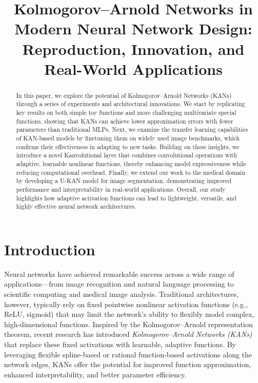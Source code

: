 \documentclass[conference]{IEEEtran}
\title{\Huge Kolmogorov–Arnold Networks in Modern Neural Network Design: Reproduction, Innovation, and Real-World Applications}
\author{
    \IEEEauthorblockN{
        Dimitrios Georgoulopoulos, \textbf{03120862},\,
        Ioannis Karaparisis, \textbf{09321011},\,
        Ioakeim El-Hattab Bistrogiannis, \textbf{03400249},\\
        Panagiotis-Alexios Spanakis, \textbf{03400274},\,
        Grigorios Trakas, \textbf{03119855}
    }
}
\begin{document}
\maketitle

\begin{abstract}
    In this paper, we explore the potential of Kolmogorov–Arnold Networks (KANs)
    through a series of experiments and architectural innovations. We start by
    replicating key results on both simple toy functions and more challenging
    multivariate special functions, showing that KANs can achieve lower
    approximation errors with fewer parameters than traditional MLPs. Next, we
    examine the transfer learning capabilities of KAN-based models by finetuning
    them on widely used image benchmarks, which confirms their effectiveness in
    adapting to new tasks. Building on these insights, we introduce a novel
    Kanvolutional layer that combines convolutional operations with adaptive,
    learnable nonlinear functions, thereby enhancing model expressiveness while
    reducing computational overhead. Finally, we extend our work to the medical
    domain by developing a U-KAN model for image segmentation, demonstrating
    improved performance and interpretability in real-world applications. Overall,
    our study highlights how adaptive activation functions can lead to lightweight,
    versatile, and highly effective neural network architectures.
\end{abstract}

\section{Introduction}

Neural networks have achieved remarkable success across a wide range of
applications—from image recognition and natural language processing to
scientific computing and medical image analysis. Traditional architectures,
however, typically rely on fixed pointwise nonlinear activation functions
(e.g., ReLU, sigmoid) that may limit the network’s ability to flexibly model
complex, high-dimensional functions. Inspired by the Kolmogorov–Arnold
representation theorem, recent research has introduced \emph{Kolmogorov–Arnold
    Networks (KANs)} that replace these fixed activations with learnable, adaptive
functions. By leveraging flexible spline-based or rational function-based
activations along the network edges, KANs offer the potential for improved
function approximation, enhanced interpretability, and better parameter
efficiency.
\end{document}
